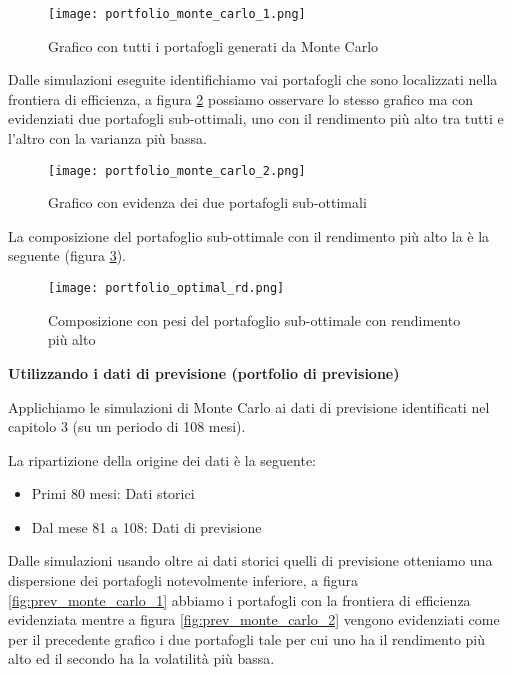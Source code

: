 \begin{figure}[ht]
    \centering
    \texttt{[image: portfolio\_monte\_carlo\_1.png]}
    \caption{Grafico con tutti i portafogli generati da Monte Carlo}
    \label{fig:pf_monte_carlo_1}
\end{figure}

\pagebreak

Dalle simulazioni eseguite identifichiamo vai portafogli che sono localizzati nella frontiera di efficienza, a figura \ref{fig:pf_monte_carlo_2} possiamo osservare
lo stesso grafico ma con evidenziati due portafogli sub-ottimali, uno con il rendimento più alto tra tutti e l'altro con la varianza più bassa.

\begin{figure}[ht]
    \centering
    \texttt{[image: portfolio\_monte\_carlo\_2.png]}
    \caption{Grafico con evidenza dei due portafogli sub-ottimali}
    \label{fig:pf_monte_carlo_2}
\end{figure}

La composizione del portafoglio sub-ottimale con il rendimento più alto la è la seguente (figura \ref{fig:pf_optimal_rd}).

\begin{figure}[ht]
    \centering
    \texttt{[image: portfolio\_optimal\_rd.png]}
    \caption{Composizione con pesi del portafoglio sub-ottimale con rendimento più alto}
    \label{fig:pf_optimal_rd}
\end{figure}

\textbf{Utilizzando i dati di previsione (portfolio di previsione)}

Applichiamo le simulazioni di Monte Carlo ai dati di previsione identificati nel capitolo 3 (su un periodo di 108 mesi).

La ripartizione della origine dei dati è la seguente:
\begin{itemize}
    \item Primi 80 mesi: Dati storici
    \item Dal mese 81 a 108: Dati di previsione
\end{itemize}

Dalle simulazioni usando oltre ai dati storici quelli di previsione otteniamo una dispersione dei portafogli notevolmente inferiore, a figura \ref{fig:prev_monte_carlo_1}
abbiamo i portafogli con la frontiera di efficienza evidenziata mentre a figura \ref{fig:prev_monte_carlo_2} vengono evidenziati come per il precedente grafico i due portafogli tale
per cui uno ha il rendimento più alto ed il secondo ha la volatilità più bassa.

